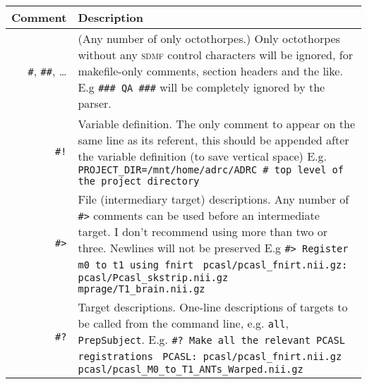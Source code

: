 \documentclass[oneside,11pt]{memoir}
\newcommand{\sdmf}{\textsc{sdmf}}
\begin{document}
	\begin{center}
	\end{center}
	
	\begin{tabularx}{\textwidth}{rX}
		\toprule
		Comment & Description \\
		\midrule
		
		\texttt{\#}, \texttt{\#\#}, \ldots 
						& (Any number of only octothorpes.) \newline Only octothorpes without any \sdmf{} control characters will be ignored, for makefile-only comments, section headers and the like. \newline E.g \texttt{\#\#\# QA \#\#\#} will be completely ignored by the parser. \\
		
		\texttt{\#!}	& Variable definition. \newline The only comment to appear on the same line as its referent, this should be appended after the variable definition (to save vertical space) \newline E.g. \newline \texttt{PROJECT\_DIR=/mnt/home/adrc/ADRC \# top level of the project directory}\\
		
		\texttt{\#>}	& File (intermediary target) descriptions. \newline Any number of \texttt{\#>} comments can be used before an intermediate target. I don't recommend using more than two or three. Newlines will not be preserved \newline E.g \newline \texttt{\#> Register m0 to t1 using fnirt} \newline \texttt{{\color{blue} pcasl/pcasl\_fnirt.nii.gz}: pcasl/Pcasl\_skstrip.nii.gz mprage/T1\_brain.nii.gz} \\
		
		\texttt{\#?}	& Target descriptions. \newline One-line descriptions of targets to be called from the command line, e.g. \texttt{all}, \texttt{PrepSubject}. \newline E.g. \newline \texttt{\#? Make all the relevant PCASL registrations} \newline \texttt{{\color{blue} PCASL}: pcasl/pcasl\_fnirt.nii.gz pcasl/pcasl\_M0\_to\_T1\_ANTs\_Warped.nii.gz}\\
		
		\bottomrule
	\end{tabularx}
	
	
	
	
\end{document}
